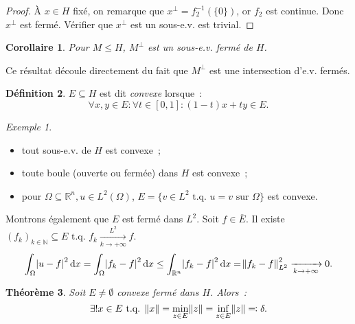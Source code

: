 \documentclass{report}
\newcommand{\R}{{\mathbb R}}
\newcommand{\N}{{\mathbb N}}
\newcommand{\tq}{\text{ t.q. }}
\newcommand{\pinfty}{{+\infty}}
\newcommand{\dx}{\dif x}
\newtheorem{thm}{Théorème}[chapter]
\newtheorem{cor}[thm]{Corollaire}
\theoremstyle{definition}
\newtheorem{déf}[thm]{Définition}
\theoremstyle{remark}
\newtheorem{ex}{Exemple}[chapter]
\begin{document}
\begin{proof} À $x \in H$ fixé, on remarque que $x^\perp = f_2^{-1}(\{0\})$, or $f_2$ est continue. Donc $x^\perp$ est fermé. Vérifier que $x^\perp$ est un sous-e.v. est trivial.
\end{proof}

\begin{cor} Pour $M \leq H$, $M^\perp$ est un sous-e.v. fermé de $H$.
\end{cor}

Ce résultat découle directement du fait que $M^\perp$ est une intersection d'e.v. fermés.

\begin{déf} $E \subseteq H$ est dit \textit{convexe} lorsque~:
\[\forall x, y \in E : \forall t \in [0, 1] : (1-t)x + ty \in E.\]
\end{déf}

\begin{ex}~
\begin{itemize}
	\item tout sous-e.v. de $H$ est convexe~;
	\item toute boule (ouverte ou fermée) dans $H$ est convexe~;
	\item pour $\Omega \subseteq \R^n, u \in L^2(\Omega)$, $E = \{v \in L^2 \tq u=v \text{ sur } \Omega\}$ est convexe.
\end{itemize}

Montrons également que $E$ est fermé dans $L^2$. Soit $f \in \overline E$. Il existe $(f_k)_{k \in \N} \subseteq E \tq f_k \xrightarrow[k \to \pinfty]{L^2} f$.
\[\int_\Omega \abs {u-f}^2\dx = \int_\Omega\abs {f_k-f}^2\dif x \leq \int_{\R^n}\abs {f_k-f}^2\dx = \norm {f_k-f}_{L^2}^2 \xrightarrow[k \to \pinfty]{} 0.\]
\end{ex}

\begin{thm} Soit $E \neq \emptyset$ convexe fermé dans $H$. Alors~:
\[\exists! x \in E \tq \norm x = \min_{z \in E}\norm z = \inf_{z \in E}\norm z \eqqcolon \delta.\]
\end{thm}
\end{document}
